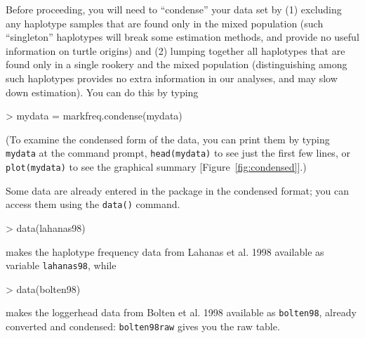 \documentclass[11pt]{article}
\begin{document}
Before proceeding, you will need to ``condense'' your data
set by (1) excluding any haplotype samples that are found only in the
mixed population (such ``singleton'' haplotypes
will break some estimation methods, and
provide no useful information on turtle origins) and (2) lumping
together all haplotypes that are found only in a single rookery and
the mixed population (distinguishing among such haplotypes provides no
extra information in our analyses, and may slow down estimation).
You can do this by typing
\begin{Schunk}
\begin{Sinput}
> mydata = markfreq.condense(mydata)
\end{Sinput}
\end{Schunk}
(To examine the condensed form of the data,
you can print them by typing \verb+mydata+ at
the command prompt, \verb+head(mydata)+ to see
just the first few lines, or \verb+plot(mydata)+ to see
the graphical summary [Figure~\ref{fig:condensed}].)

Some data are already entered in the package
in the condensed format; you can access them
using the {\tt data()} command.
\begin{Schunk}
\begin{Sinput}
> data(lahanas98)
\end{Sinput}
\end{Schunk}
makes the haplotype frequency data from Lahanas et al. 1998
\cite{Laha+98} available as variable {\tt lahanas98}, while
\begin{Schunk}
\begin{Sinput}
> data(bolten98)
\end{Sinput}
\end{Schunk}
makes the loggerhead data from Bolten et al. 1998
\cite{Bolt+98} available as {\tt bolten98},
already converted and condensed: {\tt bolten98raw}
gives you the raw table.
\end{document}
